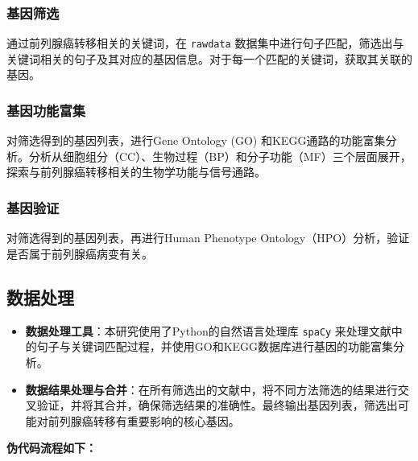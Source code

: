\documentclass{article}
\begin{document}
\subsubsection*{基因筛选}

通过前列腺癌转移相关的关键词，在 \texttt{rawdata} 数据集中进行句子匹配，筛选出与关键词相关的句子及其对应的基因信息。对于每一个匹配的关键词，获取其关联的基因。

\subsubsection*{基因功能富集}

对筛选得到的基因列表，进行Gene Ontology (GO) 和KEGG通路的功能富集分析。分析从细胞组分（CC）、生物过程（BP）和分子功能（MF）三个层面展开，探索与前列腺癌转移相关的生物学功能与信号通路。

\subsubsection*{基因验证}

对筛选得到的基因列表，再进行Human Phenotype Ontology（HPO）分析，验证是否属于前列腺癌病变有关。

\subsection*{数据处理}

\begin{itemize}
    \item \textbf{数据处理工具}：本研究使用了Python的自然语言处理库 \texttt{spaCy} 来处理文献中的句子与关键词匹配过程，并使用GO和KEGG数据库进行基因的功能富集分析。
    \item \textbf{数据结果处理与合并}：在所有筛选出的文献中，将不同方法筛选的结果进行交叉验证，并将其合并，确保筛选结果的准确性。最终输出基因列表，筛选出可能对前列腺癌转移有重要影响的核心基因。
\end{itemize}
\textbf{伪代码流程如下：}
\end{document}
